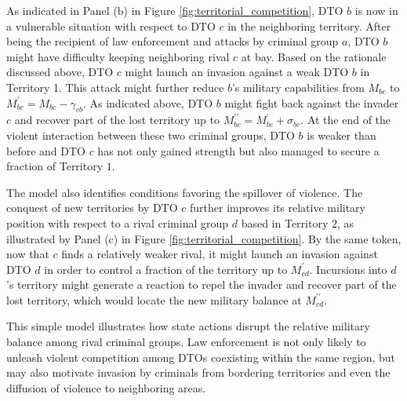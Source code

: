 \documentclass[12pt,letterpaper]{article}
\begin{document}
As indicated in Panel (b) in Figure \ref{fig:territorial_competition}, DTO $b$ is now in a vulnerable situation with respect to DTO $c$ in the neighboring territory. After being the recipient of law enforcement and attacks by criminal group $a$, DTO $b$ might have difficulty keeping neighboring rival $c$ at bay. Based on the rationale discussed above, DTO $c$ might launch an invasion against a weak DTO $b$ in Territory 1. This attack might further reduce $b$'s military capabilities from $M_{bc}$ to $M^{\prime}_{bc}=M_{bc}-\gamma_{cb}$. As indicated above, DTO $b$ might fight back against the invader $c$ and recover part of the lost territory up to $M^{\prime\prime}_{bc}=M^{\prime}_{bc}+\sigma_{bc}$. At the end of the violent interaction between these two criminal groups, DTO $b$ is weaker than before and DTO $c$ has not only gained strength but also managed to secure a fraction of Territory $1$.  

The model also identifies conditions favoring the spillover of violence. The conquest of new territories by DTO $c$ further improves its relative military position with respect to a rival criminal group $d$ based in Territory $2$, as illustrated by Panel (c) in Figure \ref{fig:territorial_competition}. By the same token, now that $c$ finds a relatively weaker rival, it might launch an invasion against DTO $d$ in order to control a fraction of the territory up to $M^{\prime}_{cd}$. Incursions into $d$'s territory might generate a reaction to repel the invader and recover part of the lost territory, which would locate the new military balance at $M^{\prime\prime}_{cd}$. 

This simple model illustrates how state actions disrupt the relative military balance among rival criminal groups. Law enforcement is not only likely to unleash violent competition among DTOs coexisting within the same region, but may also motivate invasion by criminals from bordering territories and even the diffusion of violence to neighboring areas.   
\end{document}
